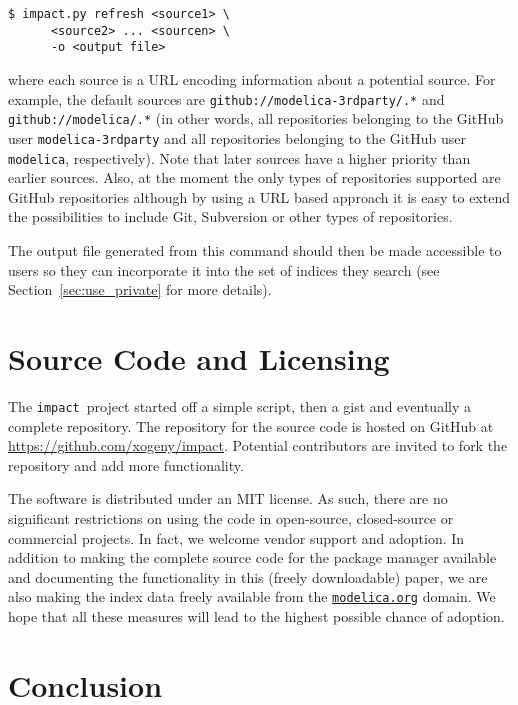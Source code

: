 \documentclass[11pt,a4paper,twocolumn]{article}
\newcommand{\impact}{\texttt{impact}} %
\newcommand{\code}[1]{\texttt{#1}} %
\begin{document}
\begin{verbatim}
$ impact.py refresh <source1> \
      <source2> ... <sourcen> \
      -o <output file>
\end{verbatim}

where each source is a URL encoding information about a potential
source.  For example, the default sources are
\code{github://modelica-3rdparty/.*} and \code{github://modelica/.*}
(in other words, all repositories belonging to the GitHub user
\code{modelica-3rdparty} and all repositories belonging to the GitHub
user \code{modelica}, respectively).  Note that later sources have a
higher priority than earlier sources.  Also, at the moment the only
types of repositories supported are GitHub repositories although by
using a URL based approach it is easy to extend the possibilities to
include Git, Subversion or other types of repositories.

The output file generated from this command should then be made
accessible to users so they can incorporate it into the set of indices
they search (see Section~\ref{sec:use_private} for more details).

\section{Source Code and Licensing}
\label{sec:source}

The \impact\ project started off a simple script, then a gist and
eventually a complete repository.  The repository for the source code
is hosted on GitHub at \url{https://github.com/xogeny/impact}.
Potential contributors are invited to fork the repository and add more
functionality.

The software is distributed under an MIT license.  As such, there are
no significant restrictions on using the code in open-source,
closed-source or commercial projects.  In fact, we welcome vendor
support and adoption.  In addition to making the complete source code
for the package manager available and documenting the functionality
in this (freely downloadable) paper, we are also making the index data
freely available from the \href{https://modelica.org}{\code{modelica.org}}
domain.  We hope that all these measures will lead to the highest possible
chance of adoption.

\section{Conclusion}
\label{sec:conclusion}
\end{document}
